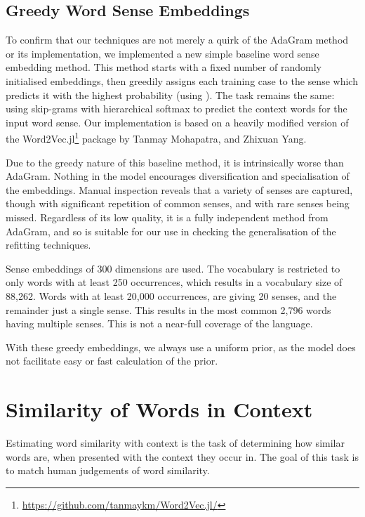 \documentclass{article}
\begin{document}
\subsection{Greedy Word Sense Embeddings}

To confirm that our techniques are not merely a quirk of the AdaGram method or its implementation, we implemented a new simple baseline word sense embedding method.
This method starts with a fixed number of randomly initialised embeddings, then greedily assigns each training case to the sense which predicts it with the highest probability (using ). The task remains the same: using skip-grams with hierarchical softmax to predict the context words for the input word sense.
Our implementation is based on a heavily modified version of the Word2Vec.jl\footnote{\url{https://github.com/tanmaykm/Word2Vec.jl/}} package by Tanmay Mohapatra, and Zhixuan Yang.

Due to the greedy nature of this baseline method, it is intrinsically worse than AdaGram. Nothing in the model encourages diversification and specialisation of the embeddings. Manual inspection reveals that a variety of senses are captured, though with significant repetition of common senses, and with rare senses being missed. Regardless of its low quality, it is a fully independent method from AdaGram, and so is suitable for our use in checking the generalisation of the refitting techniques.

Sense embeddings of 300 dimensions are used.
The vocabulary is restricted to only words with at least 250 occurrences, which results in a vocabulary size of 88,262. Words with at least 20,000 occurrences, are giving 20 senses, and the remainder just a single sense.
This results in the most common 2,796 words having multiple senses.
This is not a near-full coverage of the language. 

With these greedy embeddings, we always use a uniform prior, as the model does not facilitate easy or fast calculation of the prior.



\section{Similarity of Words in Context} \label{SimilarityInContext}
Estimating word similarity with context is the task of determining how similar words are, when presented with the context they occur in. The goal of this task is to match human judgements of word similarity.
\end{document}
